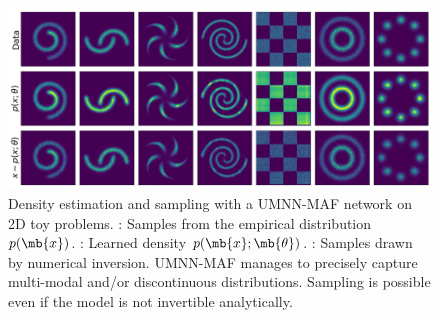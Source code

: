 

\begin{figure}
    \centering
    \includegraphics[width=.85\textwidth]{figures/chapter05/toy/all_flow.png}
    \vspace{-0.75em}
    \caption{Density estimation and sampling with a UMNN-MAF network on 2D toy problems. : Samples from the empirical distribution $p(\mb{x})$. : Learned density $p(\mb{x};\mb{\theta})$. : Samples drawn by numerical inversion.
    UMNN-MAF manages to precisely capture multi-modal and/or discontinuous distributions.
    Sampling is possible even if the model is not invertible analytically.}
    \label{fig:toys}
\end{figure}
